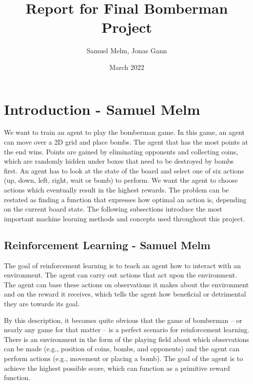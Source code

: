 \documentclass{article}
\title{Report for Final Bomberman Project}
\author{Samuel Melm, Jonas Gann}
\date{March 2022}
\begin{document}
\begin{titlingpage}
\maketitle
\end{titlingpage}

\tableofcontents
\newpage

\section[Introduction]{Introduction {\small - Samuel Melm}}

We want to train an agent to play the bomberman game. In this game, an agent can move over a 2D grid and place bombs. The agent that has the most points at the end wins. Points are gained by eliminating opponents and collecting coins, which are randomly hidden under boxes that need to be destroyed by bombs first. An agent has to look at the state of the board and select one of six actions (up, down, left, right, wait or bomb) to perform. We want the agent to choose actions which eventually result in the highest rewards. The problem can be restated as finding a function that expresses how optimal an action is, depending on the current board state. The following subsections introduce the most important machine learning methods and concepts used throughout this project.

\subsection[Reinforcement Learning]{Reinforcement Learning {\small - Samuel Melm}}
The goal of reinforcement learning is to teach an agent how to interact with an environment. The agent can carry out actions that act upon the environment. The agent can base these actions on observations it makes about the environment and on the reward it receives, which tells the agent how beneficial or detrimental they are towards its goal. 

By this description, it becomes quite obvious that the game of bomberman -- or nearly any game for that matter -- is a perfect scenario for reinforcement learning. There is an environment in the form of the playing field about which observations can be made (e.g., position of coins, bombs, and opponents) and the agent can perform actions (e.g., movement or placing a bomb). The goal of the agent is to achieve the highest possible score, which can function as a primitive reward function.
\end{document}
